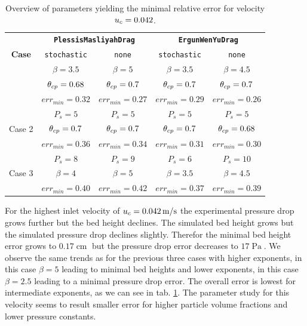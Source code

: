 \begin{table}[h!]
    \centering
    \small
    \renewcommand{\arraystretch}{1.3}
    \setlength{\tabcolsep}{5pt}
    \begin{tabular}{c|cc|cc}
        \toprule
        \multirow{3}{*}{\textbf{Case}} & \multicolumn{2}{c|}{\textbf{\lstinline|PlessisMasliyahDrag|}} & \multicolumn{2}{c}{\textbf{\lstinline|ErgunWenYuDrag|}} \\
         & \lstinline|stochastic| & \lstinline|none| & \lstinline|stochastic| & \lstinline|none| \\
        \midrule
        \multirow{3}{*}{Case 1} & $\beta = 3.5$ & $\beta = 5$ & $\beta = 3.5$ & $\beta = 4.5$ \\
                                & $\theta_{cp} = 0.68$ & $\theta_{cp} =0.7 $ & $\theta_{cp} = 0.7$ & $\theta_{cp} = 0.7$ \\
                                & $err_{min} = 0.32 $ & $err_{min} = 0.27$ & $err_{min} = 0.29$ & $err_{min} =0.26 $ \\
        \midrule
        \multirow{3}{*}{Case 2} & $P_s = 5$ & $P_s = 5$ & $P_s  = 5$ & $P_s = 5$ \\
                                & $\theta_{cp} =0.7$ & $\theta_{cp} = 0.7$ & $\theta_{cp} = 0.7$ & $\theta_{cp} = 0.68$ \\
                                & $err_{min} = 0.36$ & $err_{min} = 0.34$ & $err_{min} = 0.31$ & $err_{min} = 0.30$ \\
        \midrule
        \multirow{3}{*}{Case 3} & $P_s = 8$ & $P_s = 9$ & $P_s = 6$ & $P_s = 10$ \\
                                & $\beta = 4$ & $\beta = 5$ & $\beta = 3.5$ & $\beta = 4.5$ \\
                                & $err_{min} = 0.40$ & $err_{min} = 0.42$ & $err_{min} =0.37 $ & $err_{min} = 0.39$ \\
        \bottomrule
    \end{tabular}
    \caption{Overview of parameters yielding the minimal relative error for velocity $u_c = 0.042$.}
    \label{tab:minPar0042}
\end{table}
For the highest inlet velocity of $u_c = 0.042 \operatorname{m/s}$ the experimental pressure drop grows further but the bed height declines. 
The simulated bed height grows but the simulated pressure drop declines slightly.
Therefor the minimal bed height error grows to $0.17 \operatorname{cm}$ but the pressure drop error decreases to $17 \operatorname{Pa}$. We observe the same trends as for the previous three cases with higher exponents, in this case $\beta = 5$ leading to minimal bed heights and lower exponents, in this case $\beta = 2.5$ leading to a minimal pressure drop error.
The overall error is lowest for intermediate exponents, as we can see in tab. \ref{tab:minPar0042}. The parameter study for this velocity seems to result smaller error for higher particle volume fractions and lower pressure constants.


